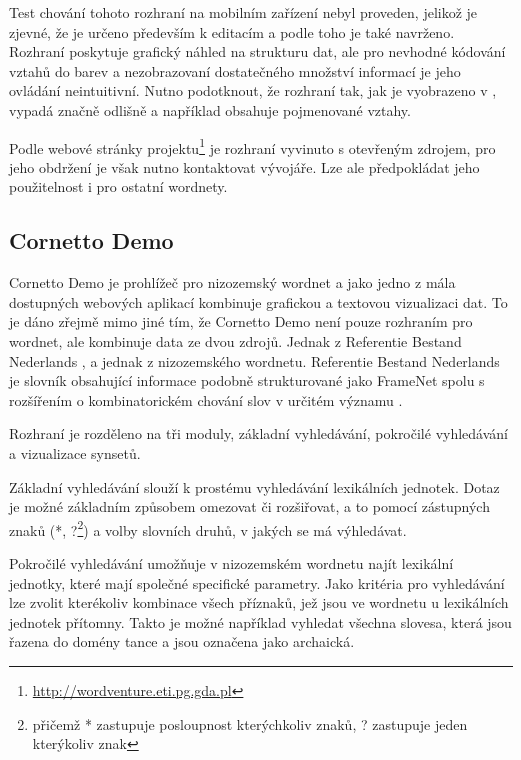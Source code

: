 \documentclass[a4paper, 11pt, oneside]{book}
\newcommand\ex{\textsf}
\begin{document}
					Test chování tohoto rozhraní na mobilním zařízení nebyl proveden, jelikož je zjevné, že je určeno především k editacím a podle toho je také navrženo. Rozhraní poskytuje grafický náhled na strukturu dat, ale pro nevhodné kódování vztahů do barev a nezobrazovaní dostatečného množství informací je jeho ovládání neintuitivní. Nutno podotknout, že rozhraní tak, jak je vyobrazeno v \textcite{szymanski2007cooperative}, vypadá značně odlišně a například obsahuje pojmenované vztahy.

					Podle webové stránky projektu\footnote{\url{http://wordventure.eti.pg.gda.pl}} je rozhraní vyvinuto s otevřeným zdrojem, pro jeho obdržení je však nutno kontaktovat vývojáře. Lze ale předpokládat jeho použitelnost i pro ostatní wordnety.

				\subsection{Cornetto Demo}
				\label{wnvis:cornetto}

					Cornetto Demo je prohlížeč pro nizozemský wordnet a jako jedno z mála dostupných webových aplikací kombinuje grafickou a textovou vizualizaci dat. To je dáno zřejmě mimo jiné tím, že Cornetto Demo není pouze rozhraním pro wordnet, ale kombinuje data ze dvou zdrojů. Jednak z Referentie Bestand Nederlands \parencite{martin2005referentie}, a jednak z nizozemského wordnetu. Referentie Bestand Nederlands je slovník obsahující informace podobně strukturované jako FrameNet \parencite{fillmore2004framenet} spolu s rozšířením o kombinatorickém chování slov v určitém významu \parencite{horak2008development}. 

					Rozhraní je rozděleno na tři moduly, základní vyhledávání, pokročilé vyhledávání a vizualizace synsetů. 

					Základní vyhledávání slouží k prostému vyhledávání lexikálních jednotek. Dotaz je možné základním způsobem omezovat či rozšiřovat, a to pomocí zástupných znaků (\ex{*}, \ex{?}\footnote{přičemž \ex{*} zastupuje posloupnost kterýchkoliv znaků, \ex{?} zastupuje jeden kterýkoliv znak}) a volby slovních druhů, v jakých se má výhledávat. \parencite{cornettoGettingStarted}

					Pokročilé vyhledávání umožňuje v nizozemském wordnetu najít lexikální jednotky, které mají společné specifické parametry. Jako kritéria pro vyhledávání lze zvolit kterékoliv kombinace všech příznaků, jež jsou ve wordnetu u lexikálních jednotek přítomny. Takto je možné například vyhledat všechna slovesa, která jsou řazena do domény tance a jsou označena jako archaická.  
\end{document}
